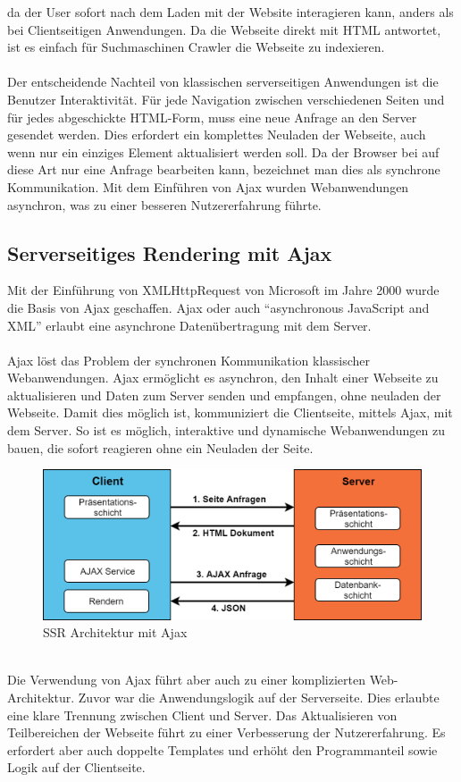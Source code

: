 \documentclass[runningheads]{llncs}
\begin{document}
da der User sofort nach dem Laden mit der Website interagieren kann, 
anders als bei Clientseitigen Anwendungen. 
Da die Webseite direkt mit HTML antwortet, ist es einfach für Suchmaschinen Crawler 
die Webseite zu indexieren. 
\\
\\
Der entscheidende Nachteil von klassischen serverseitigen Anwendungen 
ist die Benutzer Interaktivität. Für jede Navigation zwischen verschiedenen 
Seiten und für jedes abgeschickte HTML-Form, 
muss eine neue Anfrage an den Server gesendet werden. 
Dies erfordert ein komplettes Neuladen der Webseite, 
auch wenn nur ein einziges Element aktualisiert werden soll. 
Da der Browser bei auf diese Art nur eine Anfrage bearbeiten kann, 
bezeichnet man dies als synchrone Kommunikation. 
Mit dem Einführen von Ajax wurden Webanwendungen asynchron, 
was zu einer besseren Nutzererfahrung führte.

\subsection{Serverseitiges Rendering mit Ajax}
\label{subsec:Serverseitiges Rendering mit Ajax}
Mit der Einführung von XMLHttpRequest von Microsoft im Jahre 2000 wurde die Basis von Ajax geschaffen. 
Ajax oder auch “asynchronous JavaScript and XML” erlaubt eine asynchrone Datenübertragung mit dem Server.
\\
\\
Ajax löst das Problem der synchronen Kommunikation klassischer Webanwendungen. 
Ajax ermöglicht es asynchron, 
den Inhalt einer Webseite zu aktualisieren und Daten zum Server senden und empfangen, 
ohne neuladen der Webseite. Damit dies möglich ist, 
kommuniziert die Clientseite, mittels Ajax, mit dem Server. 
So ist es möglich, interaktive und dynamische Webanwendungen zu bauen, 
die sofort reagieren ohne ein Neuladen der Seite. \cite{IsomorphicApps}
\begin{figure}[h]
  \centering
  \includegraphics[width=12cm]{images/serverajax}
  \caption{SSR Architektur mit Ajax}
  \label{SSR Architektur mit Ajax}
\end{figure}
\\
Die Verwendung von Ajax führt aber auch zu einer komplizierten Web-Architektur. 
Zuvor war die Anwendungslogik auf der Serverseite. 
Dies erlaubte eine klare Trennung zwischen Client und Server. 
Das Aktualisieren von Teilbereichen der Webseite führt 
zu einer Verbesserung der Nutzererfahrung. 
Es erfordert aber auch doppelte Templates und erhöht den Programmanteil sowie Logik auf der Clientseite.
\end{document}
